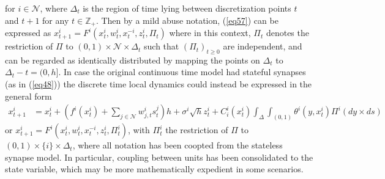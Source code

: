 \documentclass[12pt, oneside]{report}
\newcommand{\mbb}[1]{\mathbb{#1}}
\newcommand{\1}[1]{\mathbbm{1}_{\{#1\}}}
\newcommand{\mc}[1]{\mathcal{#1}}
\theoremstyle{definition}
\begin{document}
for $i\in\mc{N}$, where $\Delta_t$ is the region of time lying between discretization points $t$
and $t+1$ for any $t\in\mbb{Z}_+$. Then by a mild abuse notation, (\ref{eq57}) can
be expressed as $x^i_{t+1}=F^i(x^i_t,w^i_t,x^{-i}_t,z^i_t,\Pi_t)$
where in this context, $\Pi_t$ denotes the restriction of $\Pi$ to
$(0,1)\times\mc{N}\times\Delta_t$ such that $(\Pi_t)_{t\geq 0}$ are independent, and can be regarded as identically distributed
by mapping the points on $\Delta_t$ to $\Delta_t-t=(0,h]$. In case the original continuous time model had stateful synapses (as in (\ref{eq48}))
the discrete time local dynamics could instead be expressed in the general form
\begin{align}
    x^i_{t+1}&=x^i_t+\left(f^i(x^i_t)+\sum_{j\in\mc{N}}w^i_{j,t}s^j_t\right)h+\sigma^i\sqrt{h}z^i_t+C^i_i(x^i_t)\int_\Delta\int_{(0,1)}\theta^i(y,x^i_t)\Pi^i(dy\times ds)
\end{align}
or $x^i_{t+1}=F^i(x^i_t,w^i_t,x^{-i}_t,z^i_t,\Pi^i_t)$, with $\Pi^i_t$ the restriction of $\Pi$ to $(0,1)\times\{i\}\times\Delta_t$, where all notation has been coopted from
the stateless synapse model. In particular, coupling between units has been consolidated to the state variable, which may be more mathematically expedient in some scenarios.
\end{document}
